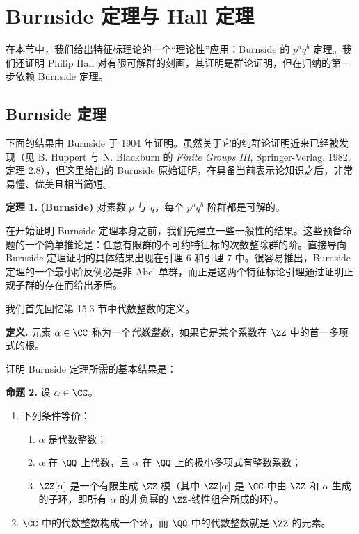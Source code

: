 \section{Burnside 定理与 Hall 定理}

在本节中，我们给出特征标理论的一个“理论性”应用：Burnside 的 $p^a q^b$ 定理。我们还证明 Philip Hall 对有限可解群的刻画，其证明是群论证明，但在归纳的第一步依赖 Burnside 定理。

\subsection*{Burnside 定理}

下面的结果由 Burnside 于 1904 年证明。虽然关于它的纯群论证明近来已经被发现（见 B. Huppert 与 N. Blackburn 的 \emph{Finite Groups III}, Springer-Verlag, 1982, 定理 2.8），但这里给出的 Burnside 原始证明，在具备当前表示论知识之后，非常易懂、优美且相当简短。

\noindent\textbf{定理 1.} \textbf{(Burnside)} 对素数 $p$ 与 $q$，每个 $p^a q^b$ 阶群都是可解的。

在开始证明 Burnside 定理本身之前，我们先建立一些一般性的结果。这些预备命题的一个简单推论是：任意有限群的不可约特征标的次数整除群的阶。直接导向 Burnside 定理证明的具体结果出现在引理 6 和引理 7 中。很容易推出，Burnside 定理的一个最小阶反例必是非 Abel 单群，而正是这两个特征标论引理通过证明正规子群的存在而给出矛盾。

我们首先回忆第 15.3 节中代数整数的定义。

\noindent\textbf{定义.} 元素 $\alpha\in\CC$ 称为一个\emph{代数整数}，如果它是某个系数在 $\ZZ$ 中的首一多项式的根。

证明 Burnside 定理所需的基本结果是：

\noindent\textbf{命题 2.} 设 $\alpha\in\CC$。
\begin{enumerate}[label=(\arabic*)]
  \item 下列条件等价：
  \begin{enumerate}[label=(\roman*)]
    \item $\alpha$ 是代数整数；
    \item $\alpha$ 在 $\QQ$ 上代数，且 $\alpha$ 在 $\QQ$ 上的极小多项式有整数系数；
    \item $\ZZ[\alpha]$ 是一个有限生成 $\ZZ$-模（其中 $\ZZ[\alpha]$ 是 $\CC$ 中由 $\ZZ$ 和 $\alpha$ 生成的子环，即所有 $\alpha$ 的非负幂的 $\ZZ$-线性组合所成的环）。
  \end{enumerate}
  \item $\CC$ 中的代数整数构成一个环，而 $\QQ$ 中的代数整数就是 $\ZZ$ 的元素。
\end{enumerate}

